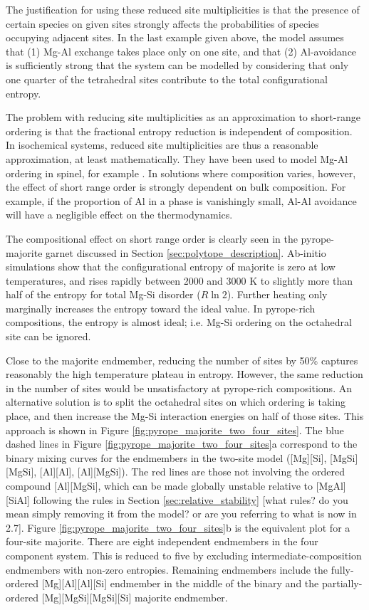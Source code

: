 \documentclass[preprint,12pt]{elsarticle}
\begin{document}
The justification for using these reduced site multiplicities is that the presence of certain species on given sites strongly affects the probabilities of species occupying adjacent sites. In the last example given above, the model assumes that (1) Mg-Al exchange takes place only on one site, and that (2) Al-avoidance is sufficiently strong that the system can be modelled by considering that only one quarter of the tetrahedral sites contribute to the total configurational entropy.

The problem with reducing site multiplicities as an approximation to short-range ordering is that the fractional entropy reduction is independent of composition. In isochemical systems, reduced site multiplicities are thus a reasonable approximation, at least mathematically. They have been used to model Mg-Al ordering in  spinel, for example \citep{HP1996a,HP2011}. In solutions where composition varies, however, the effect of short range order is strongly dependent on bulk composition. For example, if the proportion of Al in a phase is vanishingly small, Al-Al avoidance will have a negligible effect on the thermodynamics.

The compositional effect on short range order is clearly seen in the pyrope-majorite garnet discussed in Section \ref{sec:polytope_description}. Ab-initio simulations \citep{Vinograd2006} show that the configurational entropy of majorite is zero at low temperatures, and rises rapidly between 2000 and 3000 K to slightly more than half of the entropy for total Mg-Si disorder ($R\ln2$). Further heating only marginally increases the entropy toward the ideal value. In pyrope-rich compositions, the entropy is almost ideal; i.e. Mg-Si ordering on the octahedral site can be ignored. 

Close to the majorite endmember, reducing the number of sites by 50\% captures reasonably the high temperature plateau in entropy. However, the same reduction in the number of sites would be unsatisfactory at pyrope-rich compositions. An alternative solution is to split the octahedral sites on which ordering is taking place, and then increase the Mg-Si interaction energies on half of those sites. This approach is shown in Figure \ref{fig:pyrope_majorite_two_four_sites}. The blue dashed lines in Figure \ref{fig:pyrope_majorite_two_four_sites}a correspond to the binary mixing curves for the endmembers in the two-site model ([Mg][Si], [MgSi][MgSi], [Al][Al], [Al][MgSi]). The red lines are those not involving the ordered compound [Al][MgSi], which can be made globally unstable relative to [MgAl][SiAl] following the rules in Section \ref{sec:relative_stability} [what rules? do you mean simply removing it from the model? or are you referring to what is now in 2.7]. Figure \ref{fig:pyrope_majorite_two_four_sites}b is the equivalent plot for a four-site majorite. There are eight independent endmembers in the four component system. This is reduced to five by excluding intermediate-composition endmembers with non-zero entropies. Remaining endmembers include the fully-ordered [Mg][Al][Al][Si] endmember in the middle of the binary and the partially-ordered [Mg][MgSi][MgSi][Si] majorite endmember.
\end{document}
